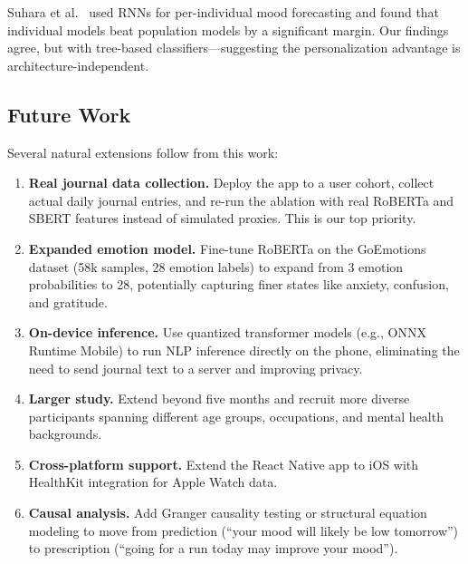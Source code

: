 \documentclass[conference]{IEEEtran}
\begin{document}
Suhara et al.~\cite{suhara2017deepmood} used RNNs for per-individual mood forecasting and found that individual models beat population models by a significant margin. Our findings agree, but with tree-based classifiers---suggesting the personalization advantage is architecture-independent.

\subsection{Future Work}

Several natural extensions follow from this work:

\begin{enumerate}
    \item \textbf{Real journal data collection.} Deploy the app to a user cohort, collect actual daily journal entries, and re-run the ablation with real RoBERTa and SBERT features instead of simulated proxies. This is our top priority.

    \item \textbf{Expanded emotion model.} Fine-tune RoBERTa on the GoEmotions dataset (58k samples, 28 emotion labels) to expand from 3 emotion probabilities to 28, potentially capturing finer states like anxiety, confusion, and gratitude.

    \item \textbf{On-device inference.} Use quantized transformer models (e.g., ONNX Runtime Mobile) to run NLP inference directly on the phone, eliminating the need to send journal text to a server and improving privacy.

    \item \textbf{Larger study.} Extend beyond five months and recruit more diverse participants spanning different age groups, occupations, and mental health backgrounds.

    \item \textbf{Cross-platform support.} Extend the React Native app to iOS with HealthKit integration for Apple Watch data.

    \item \textbf{Causal analysis.} Add Granger causality testing or structural equation modeling to move from prediction (``your mood will likely be low tomorrow'') to prescription (``going for a run today may improve your mood'').
\end{enumerate}

\end{document}
